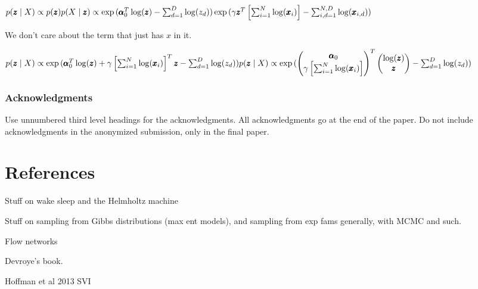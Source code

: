 \documentclass{article}
\begin{document}
\begin{math}
p(\pmb{z} \mid X) \propto p(\pmb{z}) p(X \mid \pmb{z}) \\
\propto \exp{(\pmb{\alpha}_0^T \log(\pmb{z}) - \sum_{d=1}^D \log(z_d))}\exp{(\gamma \pmb{z}^T \left[\sum_{i=1}^N \log(\pmb{x}_i) \right] - \sum_{i,d=1}^{N,D} \log(\pmb{x}_{i,d}))}
\end{math}

We don't care about the term that just has $x$ in it.

\begin{math}
p(\pmb{z} \mid X) \propto \exp{(\pmb{\alpha}_0^T \log(\pmb{z}) + \gamma  \left[\sum_{i=1}^N \log(\pmb{x}_i) \right]^T \pmb{z} - \sum_{d=1}^D \log(z_d))} \\
p(\pmb{z} \mid X) \propto \exp{(\begin{pmatrix} \pmb{\alpha}_0 \\ \gamma  \left[\sum_{i=1}^N \log(\pmb{x}_i) \right] \end{pmatrix}^T \begin{pmatrix} \log(\pmb{z}) \\ \pmb{z} \end{pmatrix} - \sum_{d=1}^D \log(z_d))}
\end{math}

  
\clearpage

\subsubsection*{Acknowledgments}

Use unnumbered third level headings for the acknowledgments. All
acknowledgments go at the end of the paper. Do not include
acknowledgments in the anonymized submission, only in the final paper.

\section*{References}




Stuff on wake sleep and the Helmholtz machine

Stuff on sampling from Gibbs distributions (max ent models), and sampling from exp fams generally, with MCMC and such.

Flow networks

Devroye's book.

Hoffman et al 2013 SVI 
\end{document}
